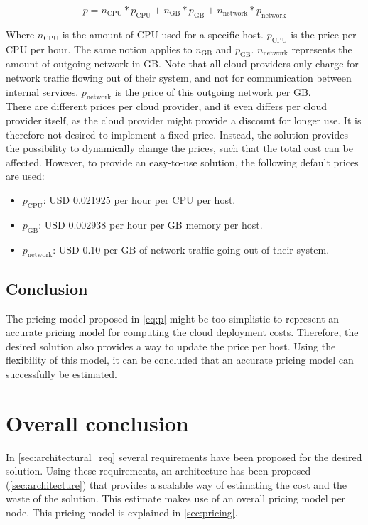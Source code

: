 \begin{equation} \label{eq:p}
p =  n_\text{CPU} * p_\text{CPU} + n_\text{GB} * p_\text{GB} + n_\text{network} * p_\text{network}
\end{equation}

\noindent
Where $n_\text{CPU}$ is the amount of CPU used for a specific host. $p_\text{CPU}$ is the price per CPU per hour. The same notion applies to $n_\text{GB}$ and $p_\text{GB}$. $n_\text{network}$ represents the amount of outgoing network in GB. Note that all cloud providers only charge for network traffic flowing out of their system, and not for communication between internal services. $p_\text{network}$ is the price of this outgoing network per GB.\\

\noindent 
There are different prices per cloud provider, and it even differs per cloud provider itself, as the cloud provider might provide a discount for longer use. It is therefore not desired to implement a fixed price. Instead, the solution provides the possibility to dynamically change the prices, such that the total cost can be affected. However, to provide an easy-to-use solution, the following default prices are used:
\begin{itemize}
    \item $p_\text{CPU}$: USD 0.021925 per hour per CPU per host.
    \item $p_\text{GB}$: USD 0.002938 per hour per GB memory per host.
    \item $p_\text{network}$: USD 0.10 per GB of network traffic going out of their system.
\end{itemize}

\subsection{Conclusion}
The pricing model proposed in \autoref{eq:p} might be too simplistic to represent an accurate pricing model for computing the cloud deployment costs. Therefore, the desired solution also provides a way to update the price per host. Using the flexibility of this model, it can be concluded that an accurate pricing model can successfully be estimated.


\section{Overall conclusion}
In \autoref{sec:architectural_req} several requirements have been proposed for the desired solution. Using these requirements, an architecture has been proposed (\autoref{sec:architecture}) that provides a scalable way of estimating the cost and the waste of the solution. This estimate makes use of an overall pricing model per node. This pricing model is explained in \autoref{sec:pricing}.